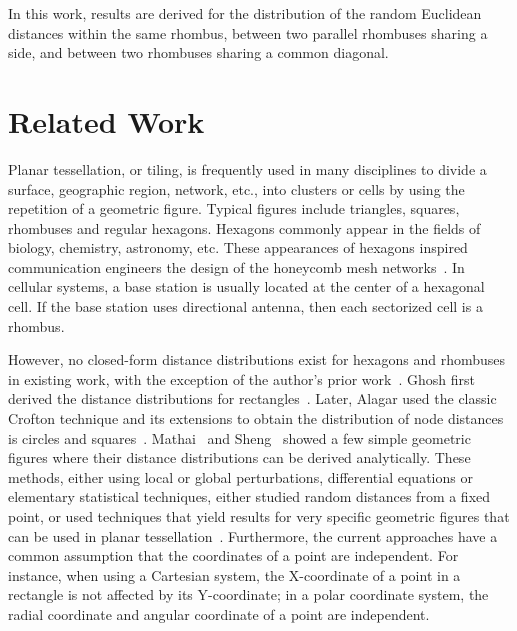 \documentclass[12pt,draftclsnofoot,onecolumn]{IEEEtran}
\begin{document}
In this work, results are derived for the distribution of
the random Euclidean distances within the same rhombus, between two parallel rhombuses
sharing a side, and between two rhombuses sharing a common diagonal.

\section{Related Work}

Planar tessellation, or tiling, is frequently used in many disciplines to divide 
a surface, geographic region, network, etc., into clusters or cells by 
using the repetition of a geometric figure. Typical figures include triangles, 
squares, rhombuses and regular hexagons. Hexagons commonly appear 
in the fields of biology, chemistry, astronomy, etc. These appearances of 
hexagons inspired communication engineers the design of the honeycomb 
mesh networks~\cite{stojmenovic1997honeycomb}. In cellular systems, a 
base station is usually located at the center of a hexagonal cell. If 
the base station uses directional antenna, then each sectorized cell is 
a rhombus.

However, no closed-form distance distributions exist for hexagons
and rhombuses in existing work, with the exception of the author's prior 
work~\cite{zhuang2011random, zhuang2012geometrical}. 
%
Ghosh first derived the distance distributions for rectangles~\cite{ghosh1943distribution, 
ghosh1943random}. Later, Alagar used the classic Crofton technique and 
its extensions to obtain the distribution of node distances is circles and 
squares~\cite{alagar1976distribution}. Mathai~\cite{mathai1998random, 
mathai1999random} and Sheng~\cite{sheng1985distance} 
showed a few simple geometric figures where their distance distributions 
can be derived analytically. These methods, either using local or global
perturbations, differential equations or elementary statistical techniques, 
either studied random distances from a fixed point, or used techniques 
that yield results for very specific geometric figures that can be used in 
planar tessellation~\cite{mathai1999introduction}.
Furthermore, the current approaches have a common assumption 
that the coordinates of a point are independent. For instance, when 
using a Cartesian system, the X-coordinate of a point in a rectangle 
is not affected by its Y-coordinate; in a polar coordinate 
system, the radial coordinate and angular coordinate of a 
point are independent. 
\end{document}
